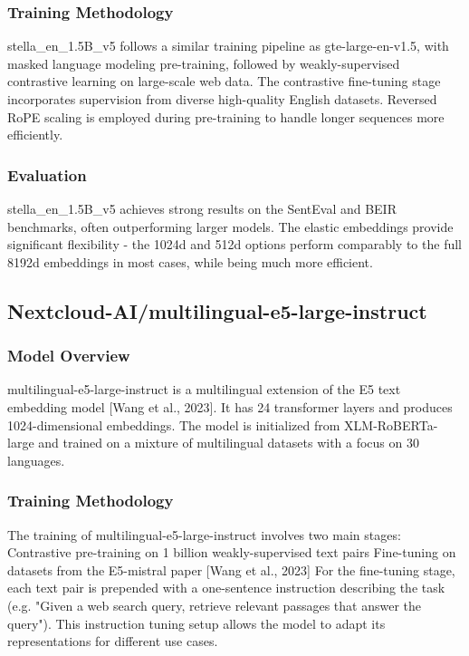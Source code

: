 \subsubsection{Training Methodology}
stella\_en\_1.5B\_v5 follows a similar training pipeline as gte-large-en-v1.5, with masked language modeling pre-training, followed by weakly-supervised contrastive learning on large-scale web data. The contrastive fine-tuning stage incorporates supervision from diverse high-quality English datasets. Reversed RoPE scaling is employed during pre-training to handle longer sequences more efficiently.

\subsubsection{Evaluation}
stella\_en\_1.5B\_v5 achieves strong results on the SentEval and BEIR benchmarks, often outperforming larger models. The elastic embeddings provide significant flexibility - the 1024d and 512d options perform comparably to the full 8192d embeddings in most cases, while being much more efficient.

\subsection{Nextcloud-AI/multilingual-e5-large-instruct}\label{subsec:nextcloud-ai}

\subsubsection{Model Overview}
multilingual-e5-large-instruct is a multilingual extension of the E5 text embedding model [Wang et al., 2023].
It has 24 transformer layers and produces 1024-dimensional embeddings.
The model is initialized from XLM-RoBERTa-large and trained on a mixture of multilingual datasets with a focus on 30 languages.

\subsubsection{Training Methodology}
The training of multilingual-e5-large-instruct involves two main stages:
Contrastive pre-training on 1 billion weakly-supervised text pairs
Fine-tuning on datasets from the E5-mistral paper [Wang et al., 2023]
For the fine-tuning stage, each text pair is prepended with a one-sentence instruction describing the task (e.g. "Given a web search query, retrieve relevant passages that answer the query"). This instruction tuning setup allows the model to adapt its representations for different use cases.

